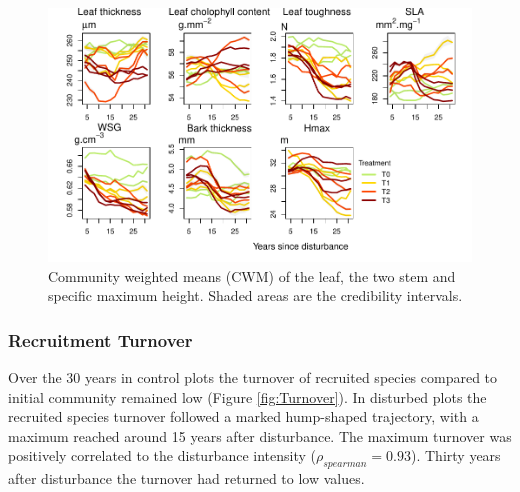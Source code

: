 \documentclass[
  11pt,
  french,
  A4paper,
  extrafontsizes,onecolumn,openright
  ]{memoir}
\begin{document}
\begin{figure}

{\centering \includegraphics[width=1\linewidth]{Manuscript_files/figure-latex/CWMbis-1} 

}

\caption{Community weighted means (CWM) of the leaf, the two stem and specific maximum height. Shaded areas are the credibility intervals.}\label{fig:CWMbis}
\end{figure}

\subsubsection{Recruitment Turnover}\label{recruitment-turnover}

Over the 30 years in control plots the turnover of recruited species
compared to initial community remained low (Figure \ref{fig:Turnover}).
In disturbed plots the recruited species turnover followed a marked
hump-shaped trajectory, with a maximum reached around 15 years after
disturbance. The maximum turnover was positively correlated to the
disturbance intensity (\(\rho_{spearman}=0.93\)). Thirty years after
disturbance the turnover had returned to low values.
\end{document}

